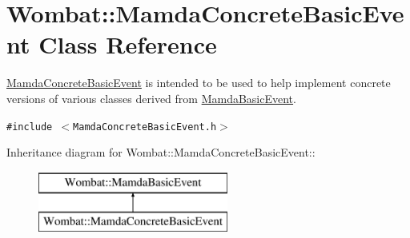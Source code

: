 \hypertarget{classWombat_1_1MamdaConcreteBasicEvent}{
\section{Wombat::Mamda\-Concrete\-Basic\-Event Class Reference}
\label{classWombat_1_1MamdaConcreteBasicEvent}
}
\hyperlink{classWombat_1_1MamdaConcreteBasicEvent}{Mamda\-Concrete\-Basic\-Event} is intended to be used to help implement concrete versions of various classes derived from \hyperlink{classWombat_1_1MamdaBasicEvent}{Mamda\-Basic\-Event}.  


{\tt \#include $<$Mamda\-Concrete\-Basic\-Event.h$>$}

Inheritance diagram for Wombat::Mamda\-Concrete\-Basic\-Event::\begin{figure}[H]
\begin{center}
\leavevmode
\includegraphics[height=2cm]{classWombat_1_1MamdaConcreteBasicEvent}
\end{center}
\end{figure}
